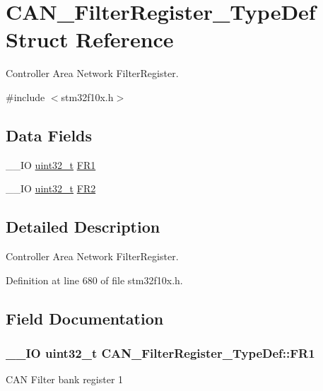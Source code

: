 \hypertarget{struct_c_a_n___filter_register___type_def}{\section{C\-A\-N\-\_\-\-Filter\-Register\-\_\-\-Type\-Def Struct Reference}
\label{struct_c_a_n___filter_register___type_def}
}


Controller Area Network Filter\-Register.  




{\ttfamily \#include $<$stm32f10x.\-h$>$}

\subsection*{Data Fields}
\begin{DoxyCompactItemize}
\item 
\-\_\-\-\_\-\-I\-O \hyperlink{stdint_8h_a435d1572bf3f880d55459d9805097f62}{uint32\-\_\-t} \hyperlink{struct_c_a_n___filter_register___type_def_ac9bc1e42212239d6830582bf0c696fc5}{F\-R1}
\item 
\-\_\-\-\_\-\-I\-O \hyperlink{stdint_8h_a435d1572bf3f880d55459d9805097f62}{uint32\-\_\-t} \hyperlink{struct_c_a_n___filter_register___type_def_a77959e28a302b05829f6a1463be7f800}{F\-R2}
\end{DoxyCompactItemize}


\subsection{Detailed Description}
Controller Area Network Filter\-Register. 

Definition at line 680 of file stm32f10x.\-h.



\subsection{Field Documentation}
\hypertarget{struct_c_a_n___filter_register___type_def_ac9bc1e42212239d6830582bf0c696fc5}{
\subsubsection[{F\-R1}]{\setlength{\rightskip}{0pt plus 5cm}\-\_\-\-\_\-\-I\-O {\bf uint32\-\_\-t} C\-A\-N\-\_\-\-Filter\-Register\-\_\-\-Type\-Def\-::\-F\-R1}}\label{struct_c_a_n___filter_register___type_def_ac9bc1e42212239d6830582bf0c696fc5}
C\-A\-N Filter bank register 1 

